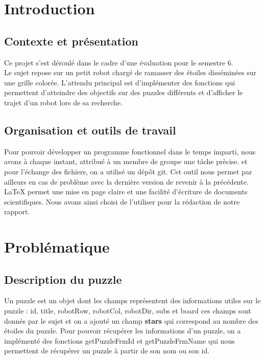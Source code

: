 \documentclass[11pt]{article}
\begin{document}
\newpage
\tableofcontents
\newpage



\section{Introduction }


\subsection{Contexte et présentation}
Ce projet s’est déroulé dans le cadre d’une évaluation pour le semestre 6.\\
Le sujet repose sur un petit robot chargé de ramasser des étoiles disséminées sur une grille colorée. L’attendu principal est d’impl\'ementer des fonctions qui permettent d'atteindre des objectifs sur des puzzles diff\'erents et d'afficher le trajet d'un robot lors de sa recherche. 


\subsection{Organisation et outils de travail}
Pour pouvoir d\'evelopper un programme fonctionnel dans le temps imparti, nous
avons \`a chaque instant, attribu\'e \`a un membre de groupe une t\^ache pr\`ecise. et pour l'\'echange des fichiers, on a utilisé un dépôt git. Cet outil nous permet par ailleurs en cas de probl\`eme avec la derni\`ere version
de revenir \`a la précédente. \\
LaTeX permet une mise en page claire et une facilit\'e d'\'ecriture de documents
scientifiques. Nous avons ainsi choisi de l’utiliser pour la r\'edaction de notre
rapport.

\section{Problématique}
\subsection{Description du puzzle}
Un puzzle est un objet dont les champs représentent des informations utiles sur le puzzle : id, title, robotRow, robotCol, robotDir, subs et board ces champs sont donnés par le sujet et on a ajouté un champ \textbf{stars} qui correspond au nombre des étoiles du puzzle. Pour pouvoir récupérer les informations d'un puzzle, on a implémenté des fonctions getPuzzleFrmId et getPuzzleFrmName qui nous permettent de récupérer un puzzle à partir de son nom ou son id.
\end{document}
